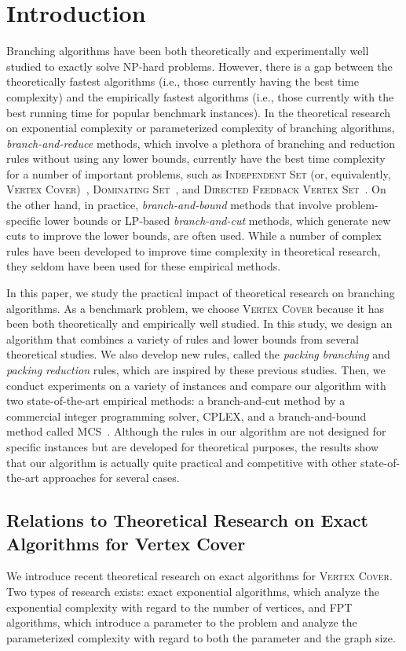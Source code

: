 \documentclass[11pt]{article}
\begin{document}
\section{Introduction}
Branching algorithms have been both theoretically and experimentally well studied to exactly solve NP-hard problems.
However, there is a gap between the theoretically fastest algorithms (i.e., those currently having the best time complexity) and
the empirically fastest algorithms (i.e., those currently with the best running time for popular benchmark instances).
In the theoretical research on exponential complexity or parameterized complexity of branching algorithms,
\emph{branch-and-reduce} methods, which involve a plethora of branching and reduction rules without using any lower bounds,
currently have the best time complexity for a number of important problems, such as \textsc{Independent Set} (or,
equivalently, \textsc{Vertex Cover})~\cite{DBLP:conf/isaac/XiaoN13,DBLP:journals/tcs/ChenKX10}, \textsc{Dominating Set}~\cite{DBLP:conf/iwpec/Iwata11}, and \textsc{Directed Feedback Vertex Set}~\cite{DBLP:conf/ictcs/Razgon07}.
On the other hand, in practice, \emph{branch-and-bound} methods that involve problem-specific lower bounds or LP-based
\emph{branch-and-cut} methods, which generate new cuts to improve the lower bounds, are often used.
While a number of complex rules have been developed to improve time complexity in theoretical research,
they seldom have been used for these empirical methods.

In this paper, we study the practical impact of theoretical research on branching algorithms.
As a benchmark problem, we choose \textsc{Vertex Cover} because it has been both theoretically and empirically well studied.
In this study, we design an algorithm that combines a variety of rules and lower bounds from several theoretical
studies.
We also develop new rules, called the \emph{packing branching} and \emph{packing reduction} rules,
which are inspired by these previous studies.
Then, we conduct experiments on a variety of instances and compare our algorithm with two state-of-the-art empirical
methods: a branch-and-cut method by a commercial integer programming solver, CPLEX, and a branch-and-bound method
called MCS~\cite{clique/mcs_walcom10}.
Although the rules in our algorithm are not designed for specific instances but are developed
for theoretical purposes, the results show that our algorithm is actually quite practical and competitive with other
state-of-the-art approaches for several cases.

\subsection{Relations to Theoretical Research on Exact Algorithms for Vertex Cover}
We introduce recent theoretical research on exact algorithms for \textsc{Vertex Cover}.
Two types of research exists: exact exponential algorithms, which analyze the exponential complexity
with regard to the number of vertices, and FPT algorithms, which introduce a parameter to the problem
and analyze the parameterized complexity with regard to both the parameter and the graph size.
\end{document}
